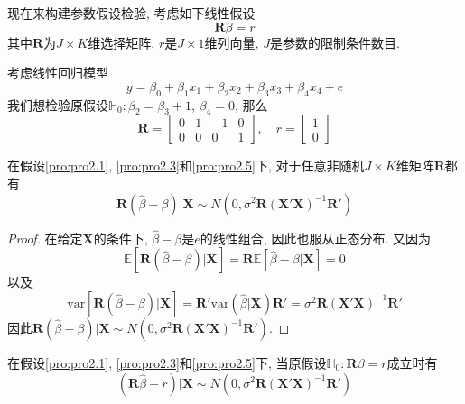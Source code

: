 \documentclass[cn, 12pt, math=mtpro2, bibstyle=apa, blue, twocol]{elegantbook}
\newcommand{\RH}{\mathbold{R}}
\newcommand{\E}{\mathbb{E}}
\newcommand{\var}{\text{var}}
\newcommand{\X}{\mathbold{X}}
\newcommand{\hb}{\hat{\beta}}
\newcommand{\HH}{\mathbb{H}}
\begin{document}
现在来构建参数假设检验, 考虑如下线性假设
$$\mathbold{R}\beta=r$$
其中$\mathbold{R}$为$J\times K$维选择矩阵, $r$是$J\times1$维列向量, $J$是参数的限制条件数目.

\begin{example}
考虑线性回归模型
$$y=\beta_0+\beta_1x_1+\beta_2x_2+\beta_3x_3+\beta_4x_4+e$$
我们想检验原假设$\HH_0: \beta_2=\beta_3+1$, $\beta_4=0$, 那么
$$\mathbold{R}=\begin{bmatrix}
                 0 & 1 & -1 & 0 \\
                 0 & 0 & 0 & 1
               \end{bmatrix},\quad r=\begin{bmatrix}
                                       1 \\
                                       0
                                     \end{bmatrix}$$
\end{example}
\begin{lemma}
在假设\ref{pro:pro2.1}, \ref{pro:pro2.3}和\ref{pro:pro2.5}下, 对于任意非随机$J\times K$维矩阵$\mathbold{R}$都有
$$\mathbold{R}(\hb-\beta)|\X\sim N(0,\sigma^2\mathbold{R}(\X'\X)^{-1}\mathbold{R}')$$
\end{lemma}
\begin{proof}
  在给定$\X$的条件下, $\hb-\beta$是$e$的线性组合, 因此也服从正态分布. 又因为
  $$\E[\RH(\hb-\beta)|\X]=\RH\E[\hb-\beta|\X]=0$$
  以及
  $$\var[\RH(\hb-\beta)|\X]=\RH'\var(\hb|\X)\RH'=\sigma^2\RH(\X'\X)^{-1}\RH'$$
  因此$\mathbold{R}(\hb-\beta)|\X\sim N(0,\sigma^2\mathbold{R}(\X'\X)^{-1}\mathbold{R}')$.
\end{proof}
\begin{corollary}\label{cor:cor2.1}
在假设\ref{pro:pro2.1}, \ref{pro:pro2.3}和\ref{pro:pro2.5}下, 当原假设$\HH_0:\RH\beta=r$成立时有
$$(\RH\hb-r)|\X\sim N(0,\sigma^2\mathbold{R}(\X'\X)^{-1}\mathbold{R}')$$
\end{corollary}
\end{document}
